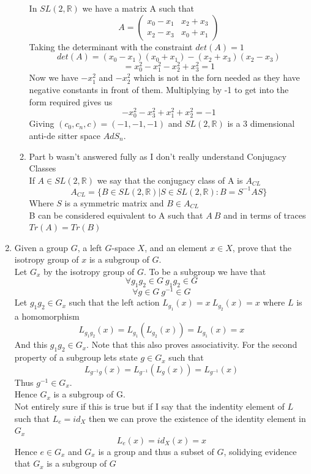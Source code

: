 \documentclass[12pt]{article}
\newcommand{\R} {\mathbb{R}}
\begin{document}
\begin{enumerate}
\begin{enumerate}
In $SL(2, \R)$ we have a matrix A such that 
$$ A = \left( \begin{array}{cc} x_0-x_1 & x_2+x_3  \\ x_2-x_3 & x_0+x_1  \end{array}\right) $$
Taking the determinant with the constraint $det(A) = 1$ 
$$ det(A) = (x_0 - x_1)(x_0 + x_1 ) - (x_2 + x_3 ) (x_2 - x_3) $$
$$ = x_0^2 - x_1^2 -x_2^2 + x_3^2 =1 $$
Now we have $-x_1^2$ and $-x_2^2$ which is not in the forn needed as they have negative constants in front of them. Multiplying by -1 to get into the form required gives us 
$$ -x_0^2 -x_3^2 + x_1^2 +x_2^2 = -1 $$ 
Giving $(c_0, c_n, c) = (-1,-1,-1)$ and $SL(2,\R)$ is a 3 dimensional anti-de sitter space $AdS_n$. 
\item Part b wasn't answered fully as I don't really understand Conjugacy Classes
\\
If $A \in SL(2,\R) $ we say that the conjugacy class of A is $A_{CL}$
$$ A_{CL} = \Big\{ B \in SL(2,\R)| S \in SL(2,\R): B= S^{-1} A S \Big\} $$
Where $S$ is a symmetric matrix and $B \in A_{CL} $
\\ B can be considered equivalent to A such that $A~B$ and in terms of traces $Tr(A) = Tr(B)$
\end{enumerate}
\item Given a group $G$, a left $G$-space $X$, and an element $x\in X$, prove that the isotropy group of $x$ is a subgroup of $G$.
\\
Let $G_x$ by the isotropy group of $G$. To be a subgroup we have that 
$$ \forall g_1 g_2 \in G \ g_1 g_2 \in G $$
$$ \forall g \in G \ g^{-1} \in G $$
Let $g_1 g_2 \in G_x $ such that the left action $L_{g_1} (x) = x \ L_{g_2} (x) = x $ where $L$ is a homomorphism
$$ L_{g_1g_2} (x) = L_{g_1} (L_{g_2}(x)) = L_{g_1} (x) = x$$
And this $g_1 g_2 \in G_x$. Note that this also proves associativity. For the second property of a subgroup lets state $g \in G_x$ such that
$$ L_{g^{-1}g}(x) = L_{g^{-1}} ( L_g (x)) = L_{g^{-1}} (x) $$
Thus $g^{-1} \in G_x$. 
\\
Hence $G_x$ is a subgroup of G. \\
Not entirely sure if this is true but if I say that the indentity element of $L$ such that $L_e = id_X$ then we can prove the existence of the identity element in $G_x$
$$ L_e(x) = id_X (x) = x $$
Hence $e \in G_x$ and $G_x$ is a group and thus a subset of $G$, solidying evidence that $G_x$ is a subgroup of $G$ 
\end{enumerate}
\end{document}
